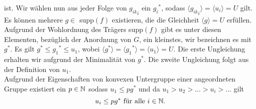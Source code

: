{ist.
%
%
%
%
%
%
%
%
%
%
%
%
%
%
%
%
%
%
%
%
Wir wählen nun aus jeder Folge von ${g_{ik}}_i$ ein ${g_i}^*$, sodass $\langle {g_{ik}}_i\rangle = \langle u_i \rangle =  U$ gilt.
Es können mehrere $g\in$ supp$(f)$ existieren, die die Gleichheit $\langle g\rangle = U$ erfüllen. Aufgrund der Wohlordnung des Trägers supp$(f)$ gibt es unter diesen Elementen, bezüglich der Anordnung von $G$, ein kleinstes, wir bezeichnen es mit $g^*$. 
Es gilt $g^* \leq {g_1}^* \leq u_1$, wobei $\langle g^*\rangle = \langle {g_1}^* \rangle = \langle u_1\rangle = U$. Die erste Ungleichung erhalten wir aufgrund der Minimalität von $g^*$. Die zweite Ungleichung folgt aus der Definition von $u_1$. \\
%
%
%
%
%
Aufgrund der Eigenschaften von konvexen Untergruppe einer angeordneten Gruppe existiert ein $p \in \mathbb{N}$ sodass $u_1 \le pg^*$ und da $u_1 > u_2 > ... > u_i > ...$ gilt 
\[u_i \le pg^*\text{ für alle }i \in \mathbb{N}.\] 

}
